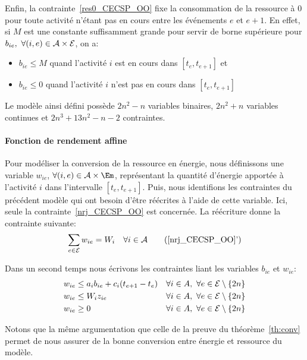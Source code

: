 Enfin, la contrainte~\eqref{res0_CECSP_OO} fixe la consommation de la
ressource à $0$ pour toute activité n'étant pas en cours entre les
événements $e$ et $e+1$. En effet, si $M$ est une constante
suffisamment grande pour servir de borne supérieure pour
$b_{ie},\ \forall (i,e) \in {\cal A}\times {\cal E}$, on a:
\begin{itemize}
\item $b_{ie}\le M$ quand l'activité $i$ est en cours dans
  $[t_e,t_{e+1}]$ et
\item $b_{ie}\le0$ quand l'activité $i$ n'est pas en cours dans
  $[t_e,t_{e+1}]$
\end{itemize}

Le modèle ainsi défini possède $2n^2-n$ variables binaires, $2n^2+n$
variables continues et $2n^3+13n^2-n-2$ contraintes.    

\paragraph{Fonction de rendement affine}

Pour modéliser la conversion de la ressource en énergie, nous
définissons une variable $w_{ie}$, $\forall (i,e) \in \A \times \Em$,
représentant la quantité d'énergie 
apportée à l'activité $i$ dans l'intervalle $[t_e,t_{e+1}]$. Puis,
nous identifions les contraintes du précédent modèle qui ont besoin
d'être réécrites à l'aide de cette variable. Ici, seule la
contrainte~\eqref{nrj_CECSP_OO} est concernée. La réécriture donne la
contrainte suivante:
\begin{equation}
\sum_{e\in \E} w_{ie}=W_i \quad \forall i \in \A
\tag{\ref{nrj_CECSP_OO}'}
\end{equation}

Dans un second temps nous écrivons les contraintes liant les variables
$b_{ie}$ et $w_{ie}$:
\begin{align}
  &w_{ie} \le a_ib_{ie}+c_i(t_{e+1}-t_e) & & \forall i \in A,\ \forall
  e \in {\cal E} \setminus\{2n\} \label{conv1_CECSP_OO}\\
  &w_{ie} \le W_i z_{ie} & & \forall i \in A,\ \forall e \in {\cal E}\setminus\{2n\} \label{conv2_CECSP_OO}\\
  & w_{ie} \ge 0 & & \forall i \in A,\ \forall e \in {\cal E}\setminus\{2n\}
  \label{Bw_CECSP_OO}
\end{align}

Notons que la même argumentation que celle de la preuve du
théorème~\ref{th:conv} permet de nous assurer de la bonne conversion
entre énergie et ressource du modèle. 

